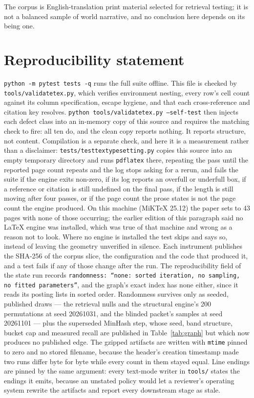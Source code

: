 \documentclass[11pt]{article}
\DeclareRobustCommand{\_}{\textunderscore\allowbreak}
\newcommand{\field}[1]{\texttt{\small #1}}
\begin{document}
The corpus is English-translation print material selected for retrieval testing; it
is not a balanced sample of world narrative, and no conclusion here depends on its
being one.

\section*{Reproducibility statement}

\texttt{python -m pytest tests -q} runs the full suite offline. This file is checked
by \texttt{tools/validate\_tex.py}, which verifies environment nesting, every row's
cell count against its column specification, escape hygiene, and that each
cross-reference and citation key resolves. \texttt{python tools/validate\_tex.py
--self-test} then injects each defect class into an in-memory copy of this source and
requires the matching check to fire: all ten do, and the clean copy reports nothing.
It reports structure, not content. Compilation is a separate check, and here it is a
measurement rather than a disclaimer: \texttt{tests/test\_tex\_typesetting.py} copies
this source into an empty temporary directory and runs \texttt{pdflatex} there, repeating
the pass until the reported page
count repeats and the log stops asking for a rerun, and fails the suite if the engine
exits non-zero, if its log reports an overfull or underfull box, if a reference or
citation is still undefined on the final pass, if the length is still moving after four
passes, or if the page count the prose states is not the page count the engine produced.
On this machine (MiKTeX 25.12) the paper sets to 43 pages with none of those
occurring; the earlier edition of this paragraph said no \LaTeX{} engine was installed,
which was true of that machine and wrong as a reason not to look. Where no engine is
installed the test skips and says so, instead of leaving the geometry unverified in
silence. Each instrument
publishes the SHA-256 of the corpus slice, the configuration and the code that
produced it, and a test fails if any of those change after the run. The
reproducibility field of the state run records
\texttt{randomness: ``none: sorted iteration, no sampling, no fitted
parameters''}, and the graph's exact index has none either, since it reads its posting
lists in sorted order. Randomness survives only as seeded, published draws --- the
retrieval nulls and the structural engine's 200 permutations at seed 20261031, and the
blinded packet's samples at seed 20261101 --- plus the superseded MinHash step, whose
seed, band structure, bucket cap and measured recall are published in
Table~\ref{tab:graph} but which now produces no published edge. The gzipped artifacts
are written with \field{mtime} pinned to zero and no stored filename, because the
header's creation timestamp made two runs differ byte for byte while every count in
them stayed equal. Line endings are pinned by the same argument: every text-mode writer in \texttt{tools/} states the endings it emits, because an unstated policy would let a reviewer's operating system rewrite the artifacts and report every downstream stage as stale.
\end{document}

